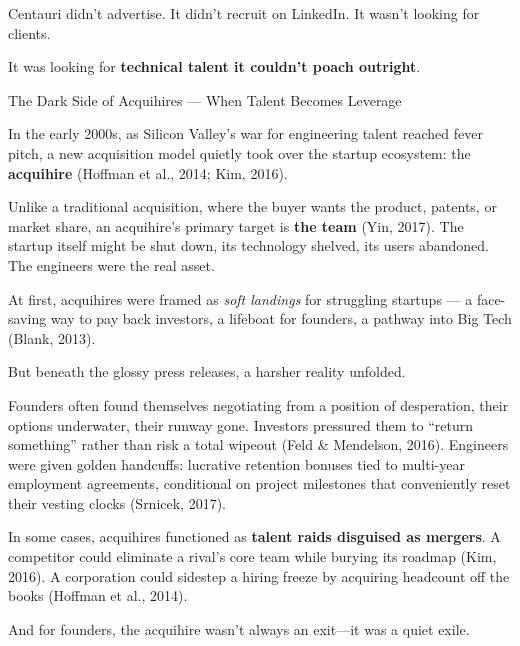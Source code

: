 Centauri didn’t advertise. It didn’t recruit on LinkedIn. It wasn’t looking for clients.

It was looking for \textbf{technical talent it couldn’t poach outright}.


\medskip

\begin{HistoricalSidebar}{The Dark Side of Acquihires --- When Talent Becomes Leverage}

  In the early 2000s, as Silicon Valley’s war for engineering talent reached fever pitch, a new 
  acquisition model quietly took over the startup ecosystem: the \textbf{acquihire} 
  (Hoffman et al., 2014; Kim, 2016).

  \medskip
  
  Unlike a traditional acquisition, where the buyer wants the product, patents, or market share, 
  an acquihire’s primary target is \textbf{the team} (Yin, 2017). The startup itself might be shut down, 
  its technology shelved, its users abandoned. The engineers were the real asset.

  \medskip
  
  At first, acquihires were framed as \textit{soft landings} for struggling startups — a face-saving way 
  to pay back investors, a lifeboat for founders, a pathway into Big Tech (Blank, 2013).

  \medskip
  
  But beneath the glossy press releases, a harsher reality unfolded.

  \medskip
  
  Founders often found themselves negotiating from a position of desperation, their options underwater, 
  their runway gone. Investors pressured them to “return something” rather than risk a total wipeout 
  (Feld \& Mendelson, 2016). Engineers were given golden handcuffs: lucrative retention bonuses tied to 
  multi-year employment agreements, conditional on project milestones that conveniently reset their 
  vesting clocks (Srnicek, 2017).

  \medskip
  
  In some cases, acquihires functioned as \textbf{talent raids disguised as mergers}. A competitor could 
  eliminate a rival’s core team while burying its roadmap (Kim, 2016). A corporation could sidestep a 
  hiring freeze by acquiring headcount off the books (Hoffman et al., 2014).

  \medskip
  
  And for founders, the acquihire wasn’t always an exit—it was a quiet exile.


\end{HistoricalSidebar}
